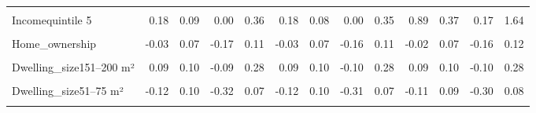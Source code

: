 \begin{table}
\begin{tabular}[t]{lrrrrrrrrrrrr}
\cellcolor{gray!10}{Incomequintile 4} & \cellcolor{gray!10}{0.13} & \cellcolor{gray!10}{0.09} & \cellcolor{gray!10}{-0.04} & \cellcolor{gray!10}{0.30} & \cellcolor{gray!10}{0.13} & \cellcolor{gray!10}{0.09} & \cellcolor{gray!10}{-0.04} & \cellcolor{gray!10}{0.30} & \cellcolor{gray!10}{0.89} & \cellcolor{gray!10}{0.36} & \cellcolor{gray!10}{0.19} & \cellcolor{gray!10}{1.65}\\
Incomequintile 5 & 0.18 & 0.09 & 0.00 & 0.36 & 0.18 & 0.08 & 0.00 & 0.35 & 0.89 & 0.37 & 0.17 & 1.64\\
\addlinespace
\cellcolor{gray!10}{Higher\_edu} & \cellcolor{gray!10}{0.13} & \cellcolor{gray!10}{0.06} & \cellcolor{gray!10}{0.02} & \cellcolor{gray!10}{0.25} & \cellcolor{gray!10}{0.14} & \cellcolor{gray!10}{0.06} & \cellcolor{gray!10}{0.02} & \cellcolor{gray!10}{0.25} & \cellcolor{gray!10}{0.13} & \cellcolor{gray!10}{0.06} & \cellcolor{gray!10}{0.02} & \cellcolor{gray!10}{0.24}\\
Home\_ownership & -0.03 & 0.07 & -0.17 & 0.11 & -0.03 & 0.07 & -0.16 & 0.11 & -0.02 & 0.07 & -0.16 & 0.12\\
\cellcolor{gray!10}{Dwelling\_house} & \cellcolor{gray!10}{0.02} & \cellcolor{gray!10}{0.07} & \cellcolor{gray!10}{-0.12} & \cellcolor{gray!10}{0.16} & \cellcolor{gray!10}{0.02} & \cellcolor{gray!10}{0.07} & \cellcolor{gray!10}{-0.12} & \cellcolor{gray!10}{0.16} & \cellcolor{gray!10}{0.02} & \cellcolor{gray!10}{0.07} & \cellcolor{gray!10}{-0.12} & \cellcolor{gray!10}{0.17}\\
Dwelling\_size151–200 m² & 0.09 & 0.10 & -0.09 & 0.28 & 0.09 & 0.10 & -0.10 & 0.28 & 0.09 & 0.10 & -0.10 & 0.28\\
\cellcolor{gray!10}{Dwelling\_size26–50 m²} & \cellcolor{gray!10}{-0.10} & \cellcolor{gray!10}{0.12} & \cellcolor{gray!10}{-0.33} & \cellcolor{gray!10}{0.15} & \cellcolor{gray!10}{-0.10} & \cellcolor{gray!10}{0.12} & \cellcolor{gray!10}{-0.34} & \cellcolor{gray!10}{0.15} & \cellcolor{gray!10}{-0.09} & \cellcolor{gray!10}{0.12} & \cellcolor{gray!10}{-0.34} & \cellcolor{gray!10}{0.14}\\
\addlinespace
Dwelling\_size51–75 m² & -0.12 & 0.10 & -0.32 & 0.07 & -0.12 & 0.10 & -0.31 & 0.07 & -0.11 & 0.09 & -0.30 & 0.08\\
\cellcolor{gray!10}{Dwelling\_size76–100 m²} & \cellcolor{gray!10}{-0.20} & \cellcolor{gray!10}{0.09} & \cellcolor{gray!10}{-0.37} & \cellcolor{gray!10}{-0.03} & \cellcolor{gray!10}{-0.20} & \cellcolor{gray!10}{0.09} & \cellcolor{gray!10}{-0.37} & \cellcolor{gray!10}{-0.03} & \cellcolor{gray!10}{-0.19} & \cellcolor{gray!10}{0.08} & \cellcolor{gray!10}{-0.35} & \cellcolor{gray!10}{-0.02}\\

\end{tabular}
\end{table}
